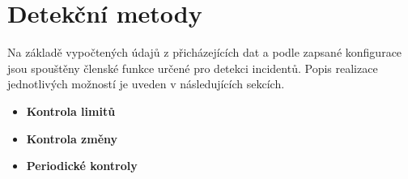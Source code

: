 \section{Detekční metody} 
 Na základě vypočtených údajů z přicházejících dat a podle zapsané konfigurace jsou spouštěny
 členské funkce určené pro detekci incidentů. Popis realizace jednotlivých možností je uveden
 v následujících sekcích.
 
\begin{itemize}
 \item \textbf{Kontrola limitů}
 \item \textbf{Kontrola změny}
 \item \textbf{Periodické kontroly}
\end{itemize}


